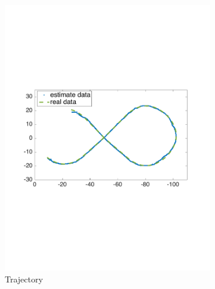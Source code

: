 \begin{figure}[!htbp]
  \centering
  \begin{subfigure}[b]{0.5\textwidth}
        \includegraphics[width=\textwidth]{img/high_altitude_error_xy.pdf}
        \caption{Trajectory}
        \label{fig:one}
   \end{subfigure} \\
   \begin{subfigure}[b]{0.35\textwidth}

\end{subfigure}
\end{figure}
